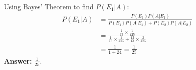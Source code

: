 \begin{enumerate}[label=\thesubsection.\arabic*, ref=\thesubsection.\theenumi]
Using Bayes' Theorem to find $P(E_1 | A)$:
\begin{align*}
P(E_1 | A) &= \frac{P(E_1)P(A | E_1)}{P(E_1)P(A | E_1) + P(E_2)P(A | E_2)} \\
&= \frac{\frac{1}{13} \times \frac{1}{425}}{\frac{1}{13} \times \frac{1}{425} + \frac{12}{13} \times \frac{2}{425}} \\
&= \frac{1}{1 + 24} = \frac{1}{25}
\end{align*}
\textbf{Answer:} $\frac{1}{25}$.






\end{enumerate}


